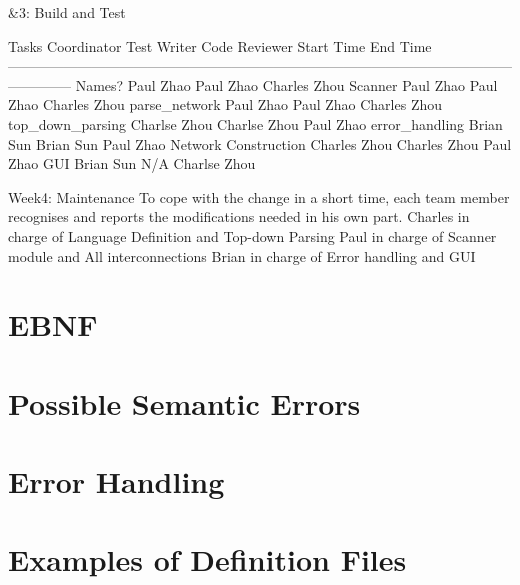 \documentclass[12pt]{article}
\begin{document}
&3: Build and Test

Tasks						Coordinator				Test Writer				Code Reviewer		Start Time		End Time
--------------------------------------------------------------------------------------------------------------------------
Names? 						Paul Zhao				Paul Zhao				Charles Zhou		
Scanner 					Paul Zhao				Paul Zhao				Charles Zhou
parse_network				Paul Zhao				Paul Zhao				Charles Zhou
top_down_parsing			Charlse Zhou			Charlse Zhou			Paul Zhao
error_handling				Brian Sun				Brian Sun				Paul Zhao
Network Construction		Charles Zhou			Charles Zhou			Paul Zhao
GUI						Brian Sun				N/A 					Charlse Zhou

Week4: Maintenance
To cope with the change in a short time, each team member recognises and reports the modifications needed in his own part. 
Charles 	in charge of		Language Definition and Top-down Parsing
Paul		in charge of 		Scanner module and All interconnections
Brian 		in charge of 		Error handling and GUI

\section{EBNF}
\section{Possible Semantic Errors}
\section{Error Handling}
\section{Examples of Definition Files}
\end{document}
